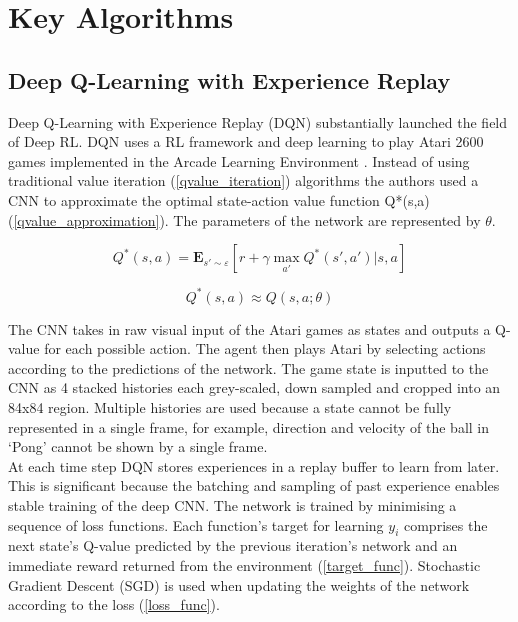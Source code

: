 \documentclass[10pt,journal,compsoc]{IEEEtran}
\begin{document}
\section{Key Algorithms}
\subsection{Deep Q-Learning with Experience Replay}
Deep Q-Learning with Experience Replay (DQN) \cite{Mnih:DQN} substantially launched the field of Deep RL. DQN uses a RL framework and deep learning to play Atari 2600 games implemented in the Arcade Learning Environment \cite{bellemare2013arcade}. Instead of using traditional value iteration (\ref{qvalue_iteration}) algorithms the authors used a CNN to approximate the optimal state-action value function Q*(s,a) (\ref{qvalue_approximation}). The parameters of the network are represented by \begin{math}\theta\end{math}.

\begin{equation}
\label{qvalue_iteration}
Q^*(s,a) = \mathbf{E}_{s'\sim\varepsilon} [r + \gamma \max_{a'} Q^*(s',a')|s,a]
\end{equation}

\begin{equation}
\label{qvalue_approximation}
Q^*(s,a) \approx Q(s,a;\theta)
\end{equation}

The CNN takes in raw visual input of the Atari games as states and outputs a Q-value for each possible action. The agent then plays Atari by selecting actions according to the predictions of the network. The game state is inputted to the CNN as 4 stacked histories each grey-scaled, down sampled and cropped into an 84x84 region. Multiple histories are used because a state cannot be fully represented in a single frame, for example, direction and velocity of the ball in ‘Pong’ cannot be shown by a single frame.
\\
At each time step DQN stores experiences in a replay buffer to learn from later. This is significant because the batching and sampling of past experience enables stable training of the deep CNN. The network is trained by minimising a sequence of loss functions. Each function's target for learning \begin{math}y_i\end{math} comprises the next state's Q-value predicted by the previous iteration’s network and an immediate reward returned from the environment (\ref{target_func}). Stochastic Gradient Descent (SGD) is used when updating the weights of the network according to the loss (\ref{loss_func}).
 
\end{document}
